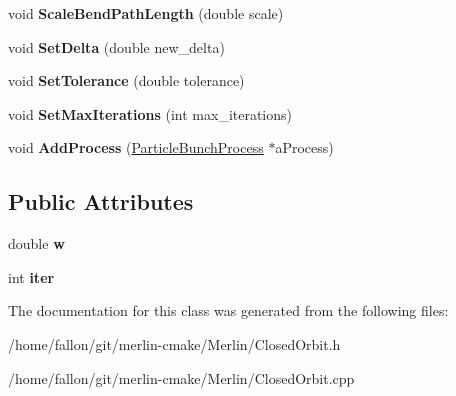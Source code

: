 \begin{DoxyCompactItemize}
void {\bfseries Scale\+Bend\+Path\+Length} (double scale)
\item 
\mbox{\label{classClosedOrbit_a959f43e822fde678d95b995050158e1f}} 
void {\bfseries Set\+Delta} (double new\+\_\+delta)
\item 
\mbox{\label{classClosedOrbit_a4894fdac476b86f3f9aacbe17b074d51}} 
void {\bfseries Set\+Tolerance} (double tolerance)
\item 
\mbox{\label{classClosedOrbit_ac8ed5c9d59bd8bf305595773ad993058}} 
void {\bfseries Set\+Max\+Iterations} (int max\+\_\+iterations)
\item 
\mbox{\label{classClosedOrbit_a88194e65d537025263bf7df39b8c2045}} 
void {\bfseries Add\+Process} (\hyperlink{classTBunchProc}{Particle\+Bunch\+Process} $\ast$a\+Process)
\end{DoxyCompactItemize}
\subsection*{Public Attributes}
\begin{DoxyCompactItemize}
\item 
\mbox{\label{classClosedOrbit_a2a375e532a8603a0e97b8819b7b770bb}} 
double {\bfseries w}
\item 
\mbox{\label{classClosedOrbit_aea27444278158b7a5ecc0e43e619bf9a}} 
int {\bfseries iter}
\end{DoxyCompactItemize}


The documentation for this class was generated from the following files\+:\begin{DoxyCompactItemize}
\item 
/home/fallon/git/merlin-\/cmake/\+Merlin/Closed\+Orbit.\+h\item 
/home/fallon/git/merlin-\/cmake/\+Merlin/Closed\+Orbit.\+cpp\end{DoxyCompactItemize}

